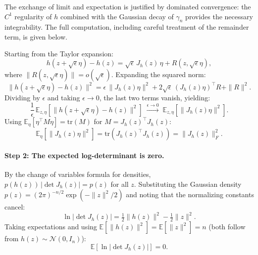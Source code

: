 The exchange of limit and expectation is justified by dominated convergence: the $C^1$ regularity of $h$ combined with the Gaussian decay of $\gamma_n$ provides the necessary integrability. The full computation, including careful treatment of the remainder term, is given below.

Starting from the Taylor expansion:
\begin{equation}
    h(z + \sqrt{\epsilon}\eta) - h(z) = \sqrt{\epsilon}\, J_h(z)\,\eta + R(z, \sqrt{\epsilon}\eta),
\end{equation}
where $\|R(z,\sqrt{\epsilon}\eta)\| = o(\sqrt{\epsilon})$. Expanding the squared norm:
\begin{equation}
    \|h(z{+}\sqrt{\epsilon}\eta) - h(z)\|^2 = \epsilon\,\|J_h(z)\eta\|^2 + 2\sqrt{\epsilon}\,(J_h(z)\eta)^\top R + \|R\|^2.
\end{equation}
Dividing by $\epsilon$ and taking $\epsilon \to 0$, the last two terms vanish, yielding:
\begin{equation}
    \frac{1}{\epsilon}\,\mathbb{E}_{z,\eta}\!\left[\|h(z{+}\sqrt{\epsilon}\eta) - h(z)\|^2\right] \;\xrightarrow{\epsilon \to 0}\; \mathbb{E}_{z,\eta}\!\left[\|J_h(z)\eta\|^2\right].
\end{equation}
Using $\mathbb{E}_\eta[\eta^\top M \eta] = \mathrm{tr}(M)$ for $M = J_h(z)^\top J_h(z)$:
\begin{equation}
    \mathbb{E}_\eta\!\left[\|J_h(z)\eta\|^2\right] = \mathrm{tr}(J_h(z)^\top J_h(z)) = \|J_h(z)\|_F^2.
\end{equation}

\paragraph{Step 2: The expected log-determinant is zero.}
By the change of variables formula for densities, $p(h(z))\,|\det J_h(z)| = p(z)$ for all $z$. Substituting the Gaussian density $p(z) = (2\pi)^{-n/2}\exp(-\|z\|^2/2)$ and noting that the normalizing constants cancel:
\begin{equation}
    \ln|\det J_h(z)| = \tfrac{1}{2}\|h(z)\|^2 - \tfrac{1}{2}\|z\|^2.
\end{equation}
Taking expectations and using $\mathbb{E}[\|h(z)\|^2] = \mathbb{E}[\|z\|^2] = n$ (both follow from $h(z) \sim \mathcal{N}(0,I_n)$):
\begin{equation}
    \mathbb{E}\!\left[\ln|\det J_h(z)|\right] = 0.
\end{equation}

